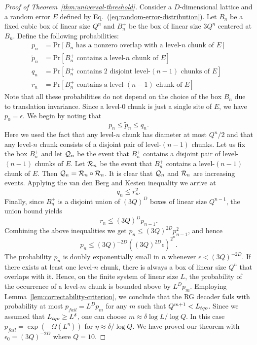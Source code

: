 \begin{proof}[Proof of Theorem~\ref{thm:universal-threshold}]
Consider a $D$-dimensional lattice
and a random error $E$ defined by Eq.~(\ref{eq:random-error-distribution}).
Let $B_n$ be a fixed cubic box of linear size $Q^n$ and
$B_n^+$ be the  box of linear
size $3Q^n$ centered at $B_n$.
Define the following probabilities:
\begin{align*}
p_n &= \mathrm{Pr}\left[ \mbox{$B_n$ has a nonzero overlap with a level-$n$ chunk of $E$}\right] \\
\tilde{p}_n &= \mathrm{Pr}\left[\mbox{$B_n^+$ contains a level-$n$ chunk of $E$}\right] \\
q_n &= \mathrm{Pr}\left[\mbox{$B_n^+$ contains $2$ disjoint  level-$(n-1)$ chunks of $E$}\right] \\
r_n &= \mathrm{Pr}\left[\mbox{$B_n^+$  contains a level-$(n-1)$ chunk of $E$}\right]
\end{align*}
Note that all these probabilities do not depend on the choice of the box $B_n$
due to translation invariance. Since a level-$0$ chunk is just a single site
of $E$, we have $p_0=\epsilon$.
We begin by noting that
\[
p_n\le \tilde{p}_n\le q_n.
\]
Here we used  the fact that
any level-$n$ chunk has diameter at most $Q^n/2$ and that any level-$n$ chunk
consists of a disjoint pair of level-$(n-1)$ chunks.
Let us fix the box $B_n^+$ and let ${\cal Q}_n$ be the event that
$B_n^+$ contains a disjoint pair of  level-$(n-1)$ chunks of $E$.
Let ${\cal R}_n$ be the event that $B_n^+$ contains a level-$(n-1)$ chunk of $E$.
Then ${\cal Q}_n={\cal R}_n\circ {\cal R}_n$.
It is clear that  ${\cal Q}_n$ and ${\cal R}_n$  are increasing events.
Applying the van den Berg and Kesten inequality we arrive at
\[
q_n\le r_n^2.
\]
Finally, since $B_n^+$ is a disjoint union of $(3Q)^D$ boxes of linear size $Q^{n-1}$,
the union bound yields
\[
r_n\le (3Q)^D p_{n-1}.
\]
Combining the above inequalities we get
$p_n \le (3Q)^{2D} p_{n-1}^2$, and hence
\[
p_n \le (3Q)^{-2D}((3Q)^{2D} \epsilon)^{2^n}.
\]
The probability $p_n$ is  doubly exponentially small in $n$
whenever $\epsilon < (3Q)^{-2D}$.
 If there exists at least one level-$n$ chunk, there is always a box of linear size $Q^n$ that overlaps with it. Hence, on the finite system of linear size $L$, the probability of the occurrence of a level-$m$ chunk is bounded above by $L^D p_m$.
 Employing
 Lemma~\ref{lem:correctability-criterion}, we conclude that the RG decoder fails with probability at most $p_{fail}=L^D p_m$
  for any $m$ such that $Q^{m+1} < {L_{tqo}}$. Since we assumed that ${L_{tqo}}\ge L^\delta$,
 one can choose $m\approx \delta \log{L}/\log{Q}$.
 In this case $p_{fail}=\exp{(-\Omega(L^\eta))}$ for $\eta \approx \delta / \log{Q}$.
 We have proved our theorem with $\epsilon_0 = (3Q)^{-2D}$ where $Q = 10$.
\end{proof} 


